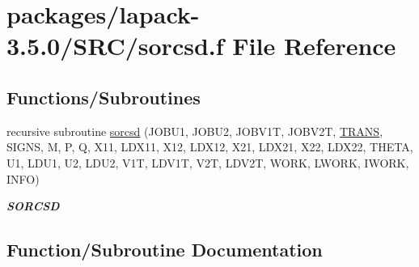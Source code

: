 \hypertarget{sorcsd_8f}{}\section{packages/lapack-\/3.5.0/\+S\+R\+C/sorcsd.f File Reference}
\label{sorcsd_8f}
\subsection*{Functions/\+Subroutines}
\begin{DoxyCompactItemize}
\item 
recursive subroutine \hyperlink{sorcsd_8f_a20dd45f6fb4a9cf696fb2ae32ed73372}{sorcsd} (J\+O\+B\+U1, J\+O\+B\+U2, J\+O\+B\+V1\+T, J\+O\+B\+V2\+T, \hyperlink{superlu__enum__consts_8h_a0c4e17b2d5cea33f9991ccc6a6678d62a1f61e3015bfe0f0c2c3fda4c5a0cdf58}{T\+R\+A\+N\+S}, S\+I\+G\+N\+S, M, P, Q, X11, L\+D\+X11, X12, L\+D\+X12, X21, L\+D\+X21, X22, L\+D\+X22, T\+H\+E\+T\+A, U1, L\+D\+U1, U2, L\+D\+U2, V1\+T, L\+D\+V1\+T, V2\+T, L\+D\+V2\+T, W\+O\+R\+K, L\+W\+O\+R\+K, I\+W\+O\+R\+K, I\+N\+F\+O)
\begin{DoxyCompactList}\small\item\em {\bfseries S\+O\+R\+C\+S\+D} \end{DoxyCompactList}\end{DoxyCompactItemize}


\subsection{Function/\+Subroutine Documentation}
\hypertarget{sorcsd_8f_a20dd45f6fb4a9cf696fb2ae32ed73372}{}
